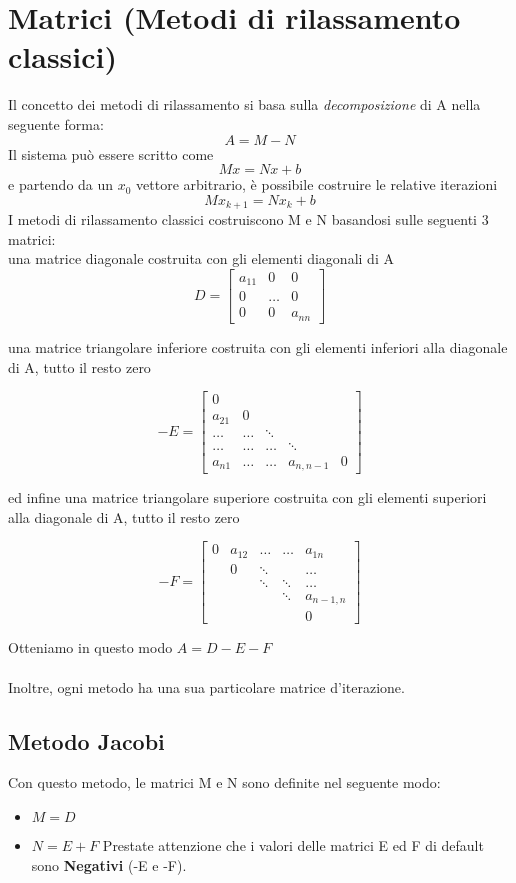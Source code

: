 \section{Matrici (Metodi di rilassamento classici)}
\label{Matrici (Metodi di rilassamento classici)}

Il concetto dei metodi di rilassamento si basa sulla \textit{decomposizione} di A nella seguente forma: $$A = M - N$$
\noindent Il sistema può essere scritto come $$Mx = Nx + b$$ e partendo da un $x_0$ vettore arbitrario, è possibile costruire le relative iterazioni
$$Mx_{k+1} = Nx_k + b$$
I metodi di rilassamento classici costruiscono M e N basandosi sulle seguenti 3 matrici:\\
\noindent una matrice diagonale costruita con gli elementi diagonali di A
 $$D = 
\begin{bmatrix}
a_{11} & 0 & 0 \\
0 & \dots &  0\\
0 & 0 & a_{nn} 
\end{bmatrix}
$$

una matrice triangolare inferiore costruita con gli elementi inferiori alla diagonale di A, tutto il resto zero

$$ -E =
\begin{bmatrix}
0 & & & &\\
a_{21} & 0 & & & \\
\dots  & \dots & \ddots & \\
\dots  &  \dots & \dots & \ddots \\
a_{n1} & \dots & \dots & a_{n,n-1} & 0 
\end{bmatrix}
$$

ed infine una matrice triangolare superiore costruita con gli elementi superiori alla diagonale di A, tutto il resto zero

$$ -F =
\begin{bmatrix}
0 & a_{12} & \dots & \dots & a_{1n} \\
 & 0 & \ddots &  & \dots \\
 &  & \ddots & \ddots  & \dots\\
 &  &  & \ddots & a_{n-1,n}\\
 &  &  &  & 0
\end{bmatrix}
$$

Otteniamo in questo modo $A = D-E-F$
\\ \\
Inoltre, ogni metodo ha una sua particolare matrice d'iterazione.

\subsection{Metodo Jacobi}
\label{Metodo Jacobi}
Con questo metodo, le matrici M e N sono definite nel seguente modo:
\begin{itemize}
\item $M = D$
\item $N = E + F$ Prestate attenzione che i valori delle matrici E ed F di default sono \textbf{Negativi} (-E e -F).
\end{itemize}

